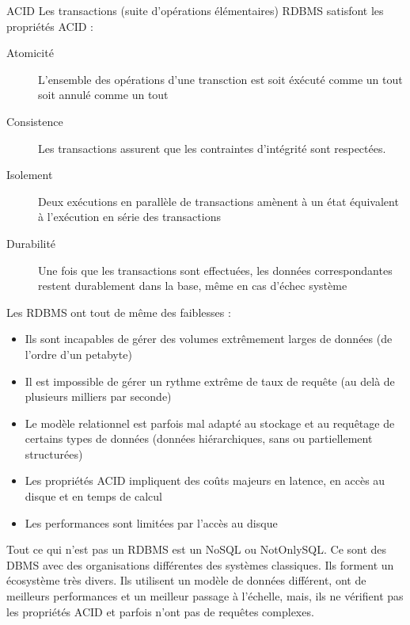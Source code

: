 \documentclass{cours}
\begin{document}
\begin{propositionfr}{ACID}{}
    Les transactions (suite d'opérations élémentaires) RDBMS satisfont les propriétés ACID :
    \begin{description}
        \item[Atomicité] L'ensemble des opérations d'une transction est soit éxécuté comme un tout soit annulé comme un tout
        \item[Consistence] Les transactions assurent que les contraintes d'intégrité sont respectées.
        \item[Isolement] Deux exécutions en parallèle de transactions amènent à un état équivalent à l'exécution en série des transactions
        \item[Durabilité] Une fois que les transactions sont effectuées, les données correspondantes restent durablement dans la base, même en cas d'échec système  
    \end{description}
\end{propositionfr}

Les RDBMS ont tout de même des faiblesses : 
\begin{itemize}
    \item Ils sont incapables de gérer des volumes extrêmement larges de données (de l'ordre d'un petabyte)
    \item Il est impossible de gérer un rythme extrême de taux de requête (au delà de plusieurs milliers par seconde)
    \item Le modèle relationnel est parfois mal adapté au stockage et au requêtage de certains types de données (données hiérarchiques, sans ou partiellement structurées)
    \item Les propriétés ACID impliquent des coûts majeurs en latence, en accès au disque et en temps de calcul
    \item Les performances sont limitées par l'accès au disque
\end{itemize}
Tout ce qui n'est pas un RDBMS est un NoSQL ou NotOnlySQL. Ce sont des DBMS avec des organisations différentes des systèmes classiques. Ils forment un écosystème très divers. Ils utilisent un modèle de données différent, ont de meilleurs performances et un meilleur passage à l'échelle, mais, ils ne vérifient pas les propriétés ACID et parfois n'ont pas de requêtes complexes. 
\end{document}

